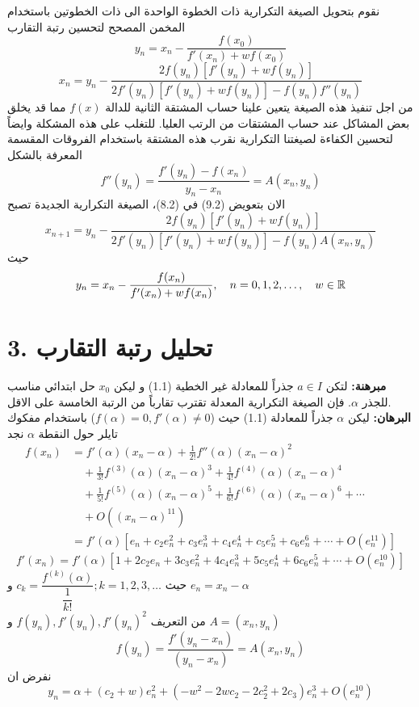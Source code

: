 نقوم بتحويل الصيغة التكرارية ذات الخطوة الواحدة الى ذات الخطوتين باستخدام المخمن المصحح لتحسين رتبة التقارب
\[
y_n = x_n - \frac{f(x_0)}{f'(x_n)+wf(x_0)}
\]
\begin{equation}
x_{n} = y_n - \frac{2f(y_n)[f'(y_n)+wf(y_n)]}{2f'(y_n)[f'(y_n)+wf(y_n)] - f(y_n)f''(y_n)} 
\end{equation}
من اجل تنفيذ هذه الصيغة يتعين علينا حساب المشتقة الثانية للدالة $f(x)$ مما قد يخلق بعض المشاكل عند حساب المشتقات من الرتب العليا. للتغلب على هذه المشكلة وايضاً لتحسين الكفاءة لصيغتنا التكرارية نقرب هذه المشتقة باستخدام الفروقات المقسمة المعرفة بالشكل
\begin{equation}
f''(y_n) = \frac{f'(y_n) - f(x_n)}{y_n - x_n} = A(x_n, y_n)
\end{equation}
الان بتعويض (9.2) في (8.2)، الصيغة التكرارية الجديدة تصبح
\begin{equation}
x_{n+1} = y_n - \frac{2f(y_n)[f'(y_n)+wf(y_n)]}{2f'(y_n) [f'(y_n) + wf(y_n)] -f(y_n)A(x_n, y_n)} 
\end{equation}
حيث
\begin{equation}
	y_n = x_n - \frac{f(x_n)}{f'(x_n) + wf(x_n)}, \quad n=0,1,2,\dots, \quad w\in\mathbb{R}
\end{equation}

\section*{3. تحليل رتبة التقارب}
\textbf{مبرهنة:} لتكن $a\in I$ جذراً للمعادلة غير الخطية (1.1) و ليكن $x_0$ حل ابتدائي مناسب للجذر $\alpha$. فإن الصيغة التكرارية المعدلة تقترب تقارباً من الرتبة الخامسة على الاقل.\\
\textbf{البرهان:} ليكن $\alpha$ جذراً للمعادلة (1.1) حيث ($f(\alpha)=0, f'(\alpha)\neq 0$) باستخدام مفكوك تايلر حول النقطة $\alpha$ نجد
\begin{align*}
	f(x_n) &= f'(\alpha)(x_n-\alpha) + \frac{1}{2!} f''(\alpha)(x_n-\alpha)^2\\
	&\quad + \frac{1}{3!} f^{(3)}(\alpha) (x_n-\alpha)^3 + \frac{1}{4!} f^{(4)}(\alpha) (x_n-\alpha)^4\\
	& \quad + \frac{1}{5!} f^{(5)}(\alpha) (x_n-\alpha)^5+ \frac{1}{6!} f^{(6)}(\alpha) (x_n-\alpha)^6 + \cdots\\
	&\quad + O((x_n-\alpha)^{11})\\
	&= f'(\alpha) [e_n + c_2e_n^2 + c_3 e_n^3 + c_4 e_n^4+ c_5 e_n^5+ c_6 e_n^6+\cdots+O(e_n^{11})]
\end{align*}
\[
f'(x_n) = f'(\alpha) [1 + 2c_2e_n + 3c_3 e_n^2 + 4c_4 e_n^3+ 5c_5 e_n^4+ 6c_6 e_n^5+\cdots+O(e_n^{10})]
\]
حيث 
$c_k = \dfrac{f^{(k)}(\alpha)}{\dfrac{1}{k!}}; k=1,2,3,\dots$
و $e_n = x_n-\alpha$\\
من التعريف
$f(y_n), f'(y_n), f'(y_n)^2$ و $A= (x_n, y_n)$
\[
f(y_n) = \frac{f'(y_n - x_n)}{(y_n - x_n)} = A(x_n, y_n)
\]
نفرض ان
\[
y_n = \alpha + (c_2+w)e_n^2 + (-w^2-2wc_2-2c_2^2+2c_3)e_n^3 + O(e_n^{10})
\]
